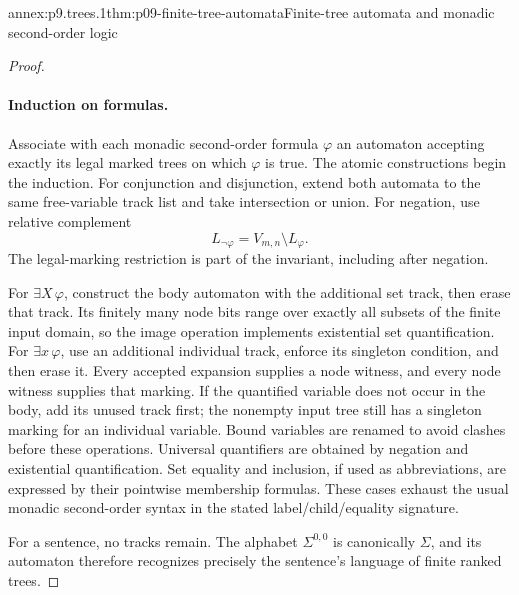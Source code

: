 \begin{annexitem}{annex:p9.trees.1}{thm:p09-finite-tree-automata}{Finite-tree automata and monadic second-order logic}
\begin{proof}
\paragraph{Induction on formulas.}
Associate with each monadic second-order formula \(\varphi\) an
automaton accepting exactly its legal marked trees on which
\(\varphi\) is true.
The atomic constructions begin the induction.
For conjunction and disjunction, extend both automata to the same
free-variable track list and take intersection or union.
For negation, use relative complement
\[
 L_{\neg\varphi}=V_{m,n}\setminus L_\varphi.
\]
The legal-marking restriction is part of the invariant, including
after negation.

For \(\exists X\,\varphi\), construct the body automaton with the
additional set track, then erase that track.
Its finitely many node bits range over exactly all subsets of the
finite input domain, so the image operation implements existential
set quantification.
For \(\exists x\,\varphi\), use an additional individual track,
enforce its singleton condition, and then erase it.
Every accepted expansion supplies a node witness, and every node
witness supplies that marking.
If the quantified variable does not occur in the body, add its
unused track first; the nonempty input tree still has a singleton
marking for an individual variable.
Bound variables are renamed to avoid clashes before these operations.
Universal quantifiers are obtained by negation and existential
quantification.  Set equality and inclusion, if used as abbreviations,
are expressed by their pointwise membership formulas.
These cases exhaust the usual monadic second-order syntax in the
stated label/child/equality signature.

For a sentence, no tracks remain.  The alphabet
\(\Sigma^{0,0}\) is canonically \(\Sigma\), and its automaton therefore
recognizes precisely the sentence's language of finite ranked trees.


\end{proof}
\end{annexitem}
